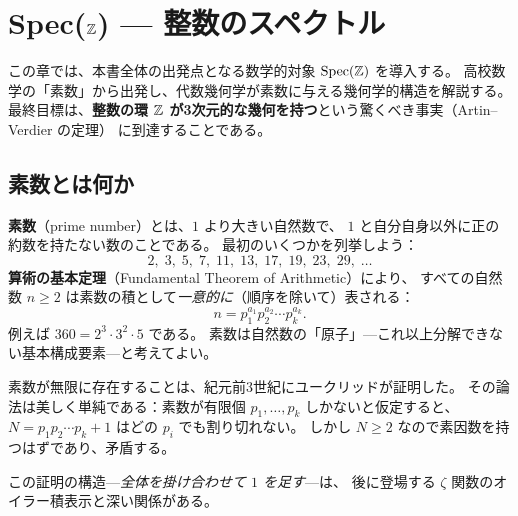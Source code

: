 
\chapter{Spec(\texorpdfstring{$\mathbb{Z}$}{Z}) --- 整数のスペクトル}
\label{ch:specZ}

この章では、本書全体の出発点となる数学的対象 $\operatorname{Spec}(\mathbb{Z})$ を導入する。
高校数学の「素数」から出発し、代数幾何学が素数に与える幾何学的構造を解説する。
最終目標は、\textbf{整数の環 $\mathbb{Z}$ が3次元的な幾何を持つ}という驚くべき事実（Artin--Verdier の定理）
に到達することである。


\section{素数とは何か}
\label{sec:primes-intro}

\begin{hsbox}
\textbf{素数}（prime number）とは、$1$ より大きい自然数で、
$1$ と自分自身以外に正の約数を持たない数のことである。
最初のいくつかを列挙しよう：
\[
  2,\; 3,\; 5,\; 7,\; 11,\; 13,\; 17,\; 19,\; 23,\; 29,\; \ldots
\]
\textbf{算術の基本定理}（Fundamental Theorem of Arithmetic）により、
すべての自然数 $n \ge 2$ は素数の積として\emph{一意的に}（順序を除いて）表される：
\[
  n = p_1^{a_1} p_2^{a_2} \cdots p_k^{a_k}.
\]
例えば $360 = 2^3 \cdot 3^2 \cdot 5$ である。
素数は自然数の「原子」---これ以上分解できない基本構成要素---と考えてよい。
\end{hsbox}

素数が無限に存在することは、紀元前3世紀にユークリッドが証明した。
その論法は美しく単純である：素数が有限個 $p_1, \ldots, p_k$ しかないと仮定すると、
$N = p_1 p_2 \cdots p_k + 1$ はどの $p_i$ でも割り切れない。
しかし $N \ge 2$ なので素因数を持つはずであり、矛盾する。

\begin{remark}
この証明の構造---\emph{全体を掛け合わせて $1$ を足す}---は、
後に登場する $\zeta$ 関数のオイラー積表示と深い関係がある。
\end{remark}

